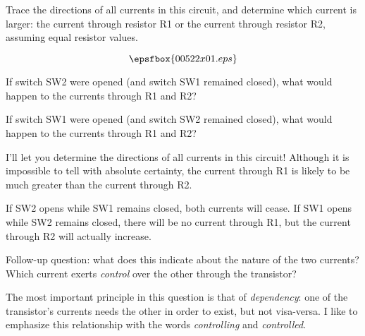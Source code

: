 

Trace the directions of all currents in this circuit, and determine which current is larger: the current through resistor R1 or the current through resistor R2, assuming equal resistor values.

$$\epsfbox{00522x01.eps}$$

If switch SW2 were opened (and switch SW1 remained closed), what would happen to the currents through R1 and R2?  

\vskip 10pt

If switch SW1 were opened (and switch SW2 remained closed), what would happen to the currents through R1 and R2?
 






I'll let you determine the directions of all currents in this circuit!  Although it is impossible to tell with absolute certainty, the current through R1 is likely to be much greater than the current through R2.

\vskip 10pt

If SW2 opens while SW1 remains closed, both currents will cease.  If SW1 opens while SW2 remains closed, there will be no current through R1, but the current through R2 will actually increase.

\vskip 10pt

Follow-up question: what does this indicate about the nature of the two currents?  Which current exerts {\it control} over the other through the transistor?







The most important principle in this question is that of {\it dependency}: one of the transistor's currents needs the other in order to exist, but not visa-versa.  I like to emphasize this relationship with the words {\it controlling} and {\it controlled}.




